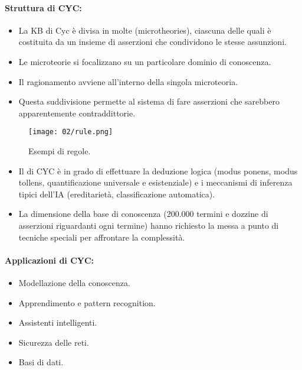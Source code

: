 \paragraph{Struttura di CYC:}

\begin{itemize}
  \item La KB di Cyc è divisa in molte  (microtheories),
ciascuna delle quali è costituita da un insieme di asserzioni che
condividono le stesse assunzioni. 
\item Le microteorie si focalizzano su un particolare dominio di conoscenza.
\item Il ragionamento avviene all’interno della singola microteoria. 
\item Questa suddivisione permette al sistema di fare asserzioni che
sarebbero apparentemente contraddittorie.
\end{itemize}

\begin{figure}[h]
    \centering
    \texttt{[image: 02/rule.png]}
    \caption{Esempi di regole.}
\end{figure}


\begin{itemize}
  \item Il  di CYC è in grado di effettuare la
deduzione logica (modus ponens, modus tollens,
quantificazione universale e esistenziale) e i
meccanismi di inferenza tipici dell’IA (ereditarietà,
classificazione automatica).
\item La dimensione della base di conoscenza (200.000
termini e dozzine di asserzioni riguardanti ogni termine)
hanno richiesto la messa a punto di tecniche speciali
per affrontare la complessità.
\end{itemize}

\paragraph{Applicazioni di CYC:}

\begin{itemize}
  \item Modellazione della conoscenza. 
  \item Apprendimento e pattern recognition. 
  \item Assistenti intelligenti. 
  \item Sicurezza delle reti. 
  \item Basi di dati.
\end{itemize}

